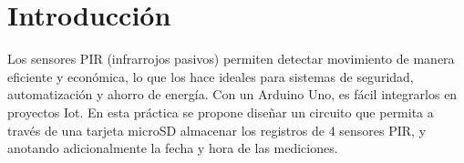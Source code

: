 \section{Introducción}
Los sensores PIR (infrarrojos pasivos) permiten detectar movimiento de manera eficiente y económica, lo que los hace ideales para sistemas de seguridad, automatización y ahorro de energía. Con un Arduino Uno, es fácil integrarlos en proyectos Iot.
En esta práctica se propone diseñar un circuito que permita a través de una tarjeta microSD almacenar los registros de 4 sensores PIR, y anotando adicionalmente la fecha y hora de las mediciones.
